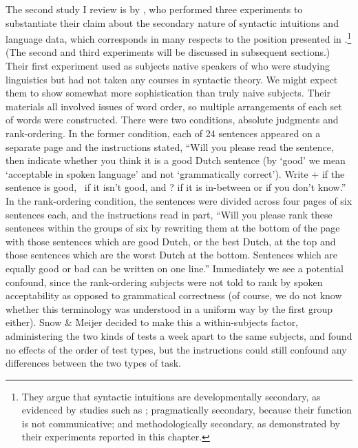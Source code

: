 \enlargethispage{\baselineskip}
The second study I review is by \citet{SnowEtAl1977}, who performed three experiments to substantiate their claim about the secondary nature of syntactic intuitions and language data, which corresponds in many respects to the position presented in .\footnote{They argue that syntactic intuitions are developmentally secondary, as evidenced by studies such as \citet{Hakes1980}; pragmatically secondary, because their function is not communicative; and methodologically secondary, as demonstrated by their experiments reported in this chapter.}
 (The second and third experiments will be discussed in subsequent sections.) Their first experiment used as subjects native speakers of  who were studying linguistics but had not taken any courses in syntactic theory. We might expect them to show somewhat more sophistication than truly naive subjects. Their materials all involved issues of word order, so multiple arrangements of each set of words were constructed. There were two conditions, absolute judgments and rank-ordering. In the former condition, each of 24 sentences appeared on a separate page and the instructions stated, ``Will you please read the sentence, then indicate whether you think it is a good Dutch sentence (by `good' we mean `acceptable in spoken language' and not `grammatically correct'). Write + if the sentence is good, \textminus~if it isn't good,
and ? if it is in-between or if you don't know.'' In the rank-ordering condition, the sentences were divided across four pages of six sentences each, and the instructions read in part, ``Will you please rank these sentences within the groups of six by rewriting them at the bottom of the page with those sentences which are good Dutch, or the best Dutch, at the top and those sentences which are the worst Dutch at the bottom. Sentences which are equally good or bad can be written on one line.'' Immediately we see a potential confound, since the rank-ordering subjects were not told to rank by spoken acceptability as opposed to grammatical correctness (of course, we do not know whether this terminology was understood in a uniform way by the first group either). Snow \& Meijer decided to make this a within-subjects
factor, administering the two kinds of tests a week apart to the same subjects, and found no effects of the order of test types, but the instructions could still confound any differences between the two types of task.

